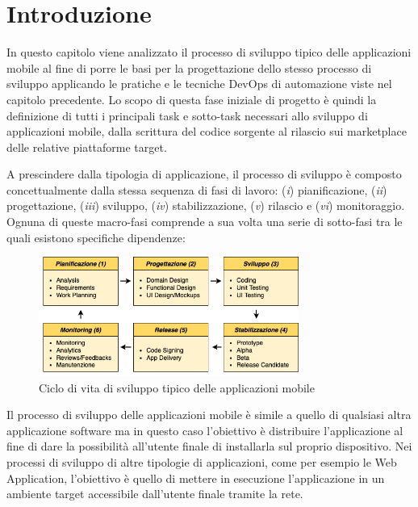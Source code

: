 
\section{Introduzione}
In questo capitolo viene analizzato il processo di sviluppo tipico delle applicazioni mobile al fine di porre le basi per la progettazione dello stesso processo di sviluppo applicando le pratiche e le tecniche DevOps di automazione viste nel capitolo precedente. Lo scopo di questa fase iniziale di progetto è quindi la definizione di tutti i principali task e sotto-task necessari allo sviluppo di applicazioni mobile, dalla scrittura del codice sorgente al rilascio sui marketplace delle relative piattaforme target. 

A prescindere dalla tipologia di applicazione, il processo di sviluppo è composto concettualmente dalla stessa sequenza di fasi di lavoro: (\textit{i}) pianificazione, (\textit{ii}) progettazione, (\textit{iii}) sviluppo, (\textit{iv}) stabilizzazione, (\textit{v}) rilascio e (\textit{vi}) monitoraggio. Ognuna di queste macro-fasi comprende a sua volta una serie di sotto-fasi tra le quali esistono specifiche dipendenze:

\begin{figure}[H]
    \centering
    \includegraphics[width=0.76\textwidth]{img/sdlc.png}
    \caption{Ciclo di vita di sviluppo tipico delle applicazioni mobile}
    \label{sdlc-app-mobile-fig}
\end{figure}

Il processo di sviluppo delle applicazioni mobile è simile a quello di qualsiasi altra applicazione software ma in questo caso l'obiettivo è distribuire l'applicazione al fine di dare la possibilità all'utente finale di installarla sul proprio dispositivo. Nei processi di sviluppo di altre tipologie di applicazioni, come per esempio le Web Application, l'obiettivo è quello di mettere in esecuzione l'applicazione in un ambiente target accessibile dall'utente finale tramite la rete.

